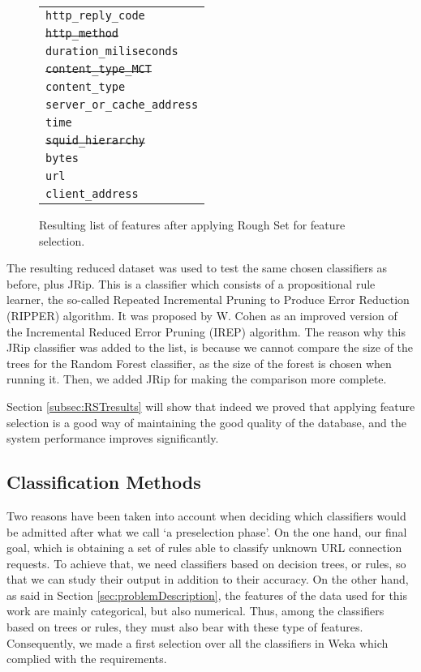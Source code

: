 \documentclass{llncs}
\begin{document}
\begin{figure}[htb]
\centering
\begin{tabular}{ p{6cm} }
  \texttt{http\_reply\_code} \\
  \texttt{\st{http\_method}} \\
  \texttt{duration\_miliseconds} \\
  \texttt{\st{content\_type\_MCT}} \\
  \texttt{content\_type} \\
  \texttt{server\_or\_cache\_address} \\
  \texttt{time} \\
  \texttt{\st{squid\_hierarchy}} \\
  \texttt{bytes} \\
  \texttt{url} \\
  \texttt{client\_address} \\
\end{tabular}
\caption{Resulting list of features after applying Rough Set for feature selection.\label{fig:data_9features}}
\end{figure} 

The resulting reduced dataset was used to test the same chosen classifiers as before, plus JRip. This is a classifier which consists of a propositional rule learner, the so-called Repeated Incremental Pruning to Produce Error Reduction (RIPPER) algorithm. It was proposed by W. Cohen \cite{cohen1995fast} as an improved version of the Incremental Reduced Error Pruning (IREP) algorithm. The reason why this JRip classifier was added to the list, is because we cannot compare the size of the trees for the Random Forest classifier, as the size of the forest is chosen when running it. Then, we added JRip for making the comparison more complete.

Section \ref{subsec:RSTresults} will show that indeed we proved that applying feature selection is a good way of maintaining the good quality of the database, and the system performance improves significantly.

%
\subsection{Classification Methods}
\label{subsec:methods}

\noindent Two reasons have been taken into account when deciding which classifiers would be admitted after what we call `a preselection phase'. On the one hand, our final goal, which is obtaining a set of rules able to classify unknown URL connection requests. To achieve that, we need classifiers based on decision trees, or rules, so that we can study their output in addition to their accuracy. On the other hand, as said in Section \ref{sec:problemDescription}, the features of the data used for this work are mainly categorical, but also numerical. Thus, among the classifiers based on trees or rules, they must also bear with these type of features. Consequently, we made a first selection over all the classifiers in Weka which complied with the requirements.
\end{document}
